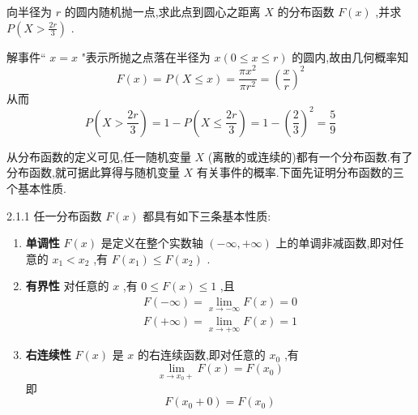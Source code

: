 \begin{example}\label{exam:2.1.1}
	向半径为 $ r $ 的圆内随机抛一点,求此点到圆心之距离 $ X $ 的分布函数 $ F(x) $ ,并求 $ P\left(X>\tfrac{2 r}{3}\right) $ .
	
	解事件`` $ x=x $ "表示所抛之点落在半径为 $ x(0 \leqslant x \leqslant r) $ 的圆内,故由几何概率知
	\[ 
	F(x)=P(X \leqslant x)=\frac{\pi x^{2}}{\pi r^{2}}=\left(\frac{x}{r}\right)^{2}
	\]
	从而
	\[ 
	P\left(X>\frac{2 r}{3}\right)=1-P\left(X \leqslant \frac{2 r}{3}\right)=1-\left(\frac{2}{3}\right)^{2}=\frac{5}{9}
	\]

\end{example}


从分布函数的定义可见,任一随机变量 $ X $ (离散的或连续的)都有一个分布函数.有了分布函数,就可据此算得与随机变量 $ X $ 有关事件的概率.下面先证明分布函数的三个基本性质.

\begin{theorem}{}{2.1.1}
	任一分布函数 $ F(x) $ 都具有如下三条基本性质:
	\begin{enumerate}
		\item \textbf{单调性} $ F(x) $ 是定义在整个实数轴 $ (-\infty,+\infty ) $ 上的单调非减函数,即对任意的 $ x_1<x_2 $ ,有 $ F(x_1)\leq F(x_2) $ .
		\item \textbf{有界性} 对任意的 $ x $ ,有 $ 0\leq F(x)\leq 1 $ ,且
		\[ 
		\begin{array}{l}{F(-\infty)=\lim _{x \rightarrow-\infty} F(x)=0} \\ {F(+\infty)=\lim _{x \rightarrow+\infty} F(x)=1}\end{array}
		\]
		
		\item \textbf{右连续性} $ F(x) $ 是 $ x $ 的右连续函数,即对任意的 $ x_0 $ ,有
		\[ 
		\lim _{x \rightarrow x_{0}+} F(x)=F\left(x_{0}\right)
		\]
		即
		\[ 
		F\left(x_{0}+0\right)=F\left(x_{0}\right)
		\]
	\end{enumerate}
\end{theorem}

